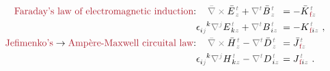 \begin{subequations} \label{eq:Curl-EH}
	\abovedisplayskip=-8pt
\begin{align}
	\textcolor{Maroon}{\text{Faraday's law of electromagnetic induction}}\text{:}&\hspace{1.2em} \mathcolor{gray}{\bar{\nabla} \times} \bar{E}^{\;\!\mathcolor{gray}{t}}_{\;\!\mathcolor{gray}{z}} + \mathcolor{gray}{\nabla^t} \bar{B}^{\;\!\mathcolor{gray}{t}}_{\;\!\mathcolor{gray}{z}} \hspace{-0.9em} &&= - \bar{K}^{\;\!\mathcolor{gray}{t}}_{\;\!\textcolor{Maroon}{\text{f}}\mathcolor{gray}{z}} \label{eq:Curl-EK} \\ 
	&\epsilon^{\hphantom{ij}k}_{i\mathcolor{gray}{j}} \mathcolor{gray}{\nabla^j} E^{\;\!\mathcolor{gray}{t}}_{\;\! k\mathcolor{gray}{z}} + \mathcolor{gray}{\nabla^t} B^{\;\!\mathcolor{gray}{t}}_{\;\! i\mathcolor{gray}{z}} \hspace{-0.9em} &&= - K^{\;\!\mathcolor{gray}{t}}_{\;\! \textcolor{Maroon}{\text{f}} i\mathcolor{gray}{z}}~, \label{eq:curl-EK} \\ 
	\textcolor{Maroon}{\text{Jefimenko's}} \to \textcolor{Maroon}{\text{Amp\`{e}re-Maxwell circuital law}}\text{:}&\hspace{1.2em} \mathcolor{gray}{\bar{\nabla} \times} \bar{H}^{\;\!\mathcolor{gray}{t}}_{\;\!\mathcolor{gray}{z}} - \mathcolor{gray}{\nabla^t} \bar{D}^{\;\!\mathcolor{gray}{t}}_{\;\!\mathcolor{gray}{z}} \hspace{-0.9em} &&= \bar{J}^{\;\!\mathcolor{gray}{t}}_{\;\!\textcolor{Maroon}{\text{f}}\mathcolor{gray}{z}} \label{eq:Curl-H} \\ 
	&\epsilon^{\hphantom{ij}k}_{i\mathcolor{gray}{j}} \mathcolor{gray}{\nabla^j} H^{\;\!\mathcolor{gray}{t}}_{\;\! k\mathcolor{gray}{z}} - \mathcolor{gray}{\nabla^t} D^{\;\!\mathcolor{gray}{t}}_{\;\! i\mathcolor{gray}{z}} \hspace{-0.9em} &&= J^{\;\!\mathcolor{gray}{t}}_{\;\! \textcolor{Maroon}{\text{f}} i\mathcolor{gray}{z}}~. \label{eq:curl-H}
\end{align}
\end{subequations}
